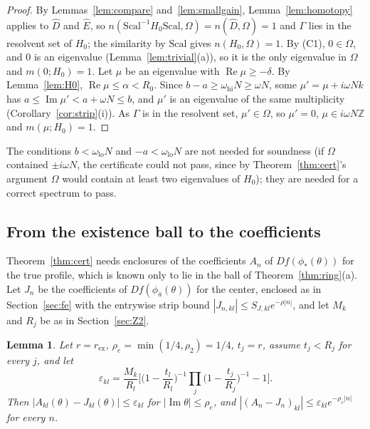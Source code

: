\documentclass[11pt]{article}
\newtheorem{lemma}{Lemma}[section]
\theoremstyle{definition}
\newcommand{\Z}{\mathbb{Z}}
\newcommand{\re}{\operatorname{Re}}
\newcommand{\im}{\operatorname{Im}}
\begin{document}
\begin{proof}
By Lemmas~\ref{lem:compare} and~\ref{lem:smallgain}, Lemma~\ref{lem:homotopy} applies to $\hat D$ and $\hat E$, so $n(\mathrm{Scal}^{-1}H_0\mathrm{Scal}, \Omega) = n(\hat D, \Omega) = 1$ and $\Gamma$ lies in the resolvent set of $H_0$; the similarity by $\mathrm{Scal}$ gives $n(H_0, \Omega) = 1$. By (C1), $0 \in \Omega$, and $0$ is an eigenvalue (Lemma~\ref{lem:trivial}(a)), so it is the only eigenvalue in $\Omega$ and $m(0; H_0) = 1$. Let $\mu$ be an eigenvalue with $\re\mu \ge -\delta$. By Lemma~\ref{lem:H0}, $\re\mu \le \alpha < R_0$. Since $b - a \ge \omega_{\mathrm{hi}}N \ge \omega N$, some $\mu' = \mu + i\omega Nk$ has $a \le \im\mu' < a + \omega N \le b$, and $\mu'$ is an eigenvalue of the same multiplicity (Corollary~\ref{cor:strip}(i)). As $\Gamma$ is in the resolvent set, $\mu' \in \Omega$, so $\mu' = 0$, $\mu \in i\omega N\Z$ and $m(\mu; H_0) = 1$.
\end{proof}

The conditions $b < \omega_{\mathrm{lo}}N$ and $-a < \omega_{\mathrm{lo}}N$ are not needed for soundness (if $\Omega$ contained $\pm i\omega N$, the certificate could not pass, since by Theorem~\ref{thm:cert}'s argument $\Omega$ would contain at least two eigenvalues of $H_0$); they are needed for a correct spectrum to pass.

\subsection{From the existence ball to the coefficients}\label{sec:coeffs}

Theorem~\ref{thm:cert} needs enclosures of the coefficients $A_n$ of $Df(\phi_*(\theta))$ for the true profile, which is known only to lie in the ball of Theorem~\ref{thm:ring}(a). Let $J_n$ be the coefficients of $Df(\phi_{\bar a}(\theta))$ for the center, enclosed as in Section~\ref{sec:fe} with the entrywise strip bound $|J_{n,kl}| \le S_{J,kl}e^{-\rho|n|}$, and let $M_k$ and $R_j$ be as in Section~\ref{sec:Z2}.

\begin{lemma}\label{lem:coeffs}
Let $r = r_{\mathrm{ex}}$, $\rho_e = \min(1/4, \rho_2) = 1/4$, $t_j = r$, assume $t_j < R_j$ for every $j$, and let
\[ \varepsilon_{kl} = \frac{M_k}{R_l}\Big[\Big(1 - \frac{t_l}{R_l}\Big)^{-1}\prod_j\Big(1 - \frac{t_j}{R_j}\Big)^{-1} - 1\Big]. \]
Then $|A_{kl}(\theta) - J_{kl}(\theta)| \le \varepsilon_{kl}$ for $|\im\theta| \le \rho_e$, and $|(A_n - J_n)_{kl}| \le \varepsilon_{kl}e^{-\rho_e|n|}$ for every $n$.
\end{lemma}
\end{document}
